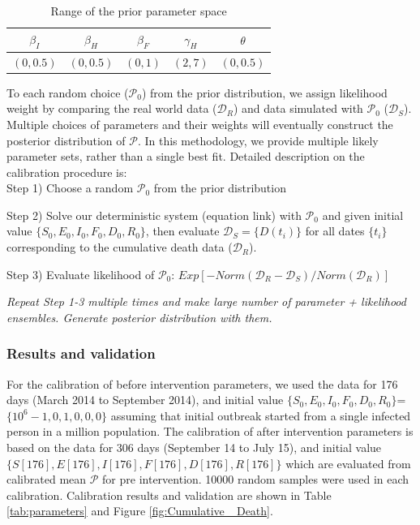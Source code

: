 \begin{table}[ht]
\caption{Range of the prior parameter space} %
\centering %
\begin{tabular}{c c c c c}
\hline\hline %
$\beta_{I}$ & $\beta_{H}$ & $\beta_{F}$ & $\gamma_{H}$ & $\theta$ \\ [0.5ex]
\hline %
$(0,0.5)$ & $(0,0.5)$ & $(0,1)$ & $(2,7)$ & $(0,0.5)$ \\ [0.5ex]
\hline
\end{tabular}
\label{tab:PriorRanges}
\end{table}


To each random choice ($\mathcal{P}_0$) from the prior distribution, we assign likelihood weight by comparing the real world data ($\mathcal{D}_R$) and data simulated with $\mathcal{P}_0$ ($\mathcal{D}_S$). Multiple choices of parameters and their weights will eventually construct the posterior distribution of $\mathcal{P}$. In this methodology, we provide multiple likely parameter sets, rather than a single best fit. Detailed description on the calibration procedure is:\\

Step 1) Choose a random $\mathcal{P}_0$ from the prior distribution

Step 2) Solve our deterministic system (equation link) with $\mathcal{P}_0$ and given initial value $\{S_0,E_0,I_0,F_0,D_0,R_0\}$, then evaluate $\mathcal{D}_S=\{D(t_i)\}$ for all dates $\{t_i\}$ corresponding to the cumulative death data ($\mathcal{D}_R$).

Step 3) Evaluate likelihood of $\mathcal{P}_0$: $Exp[-Norm(\mathcal{D}_R-\mathcal{D}_S)/Norm(\mathcal{D}_R)]$

\emph{Repeat Step 1-3 multiple times and make large number of {parameter + likelihood} ensembles. Generate posterior distribution with them.}

\subsubsection{Results and validation}
For the calibration of before intervention parameters, we used the data for 176 days (March 2014 to September 2014), and initial value $\{S_0,E_0,I_0,F_0,D_0,R_0\}$=$\{10^6-1,0,1,0,0,0\}$ assuming that initial outbreak started from a single infected person in a million population. The calibration of after intervention parameters is based on the data for 306 days (September 14 to July 15), and initial value $\{S[176],E[176],I[176],F[176],D[176],R[176]\}$ which are evaluated from calibrated mean $\mathcal{P}$ for pre intervention. 10000 random samples were used in each calibration. Calibration results and validation are shown in Table \ref{tab:parameters} and Figure \ref{fig:Cumulative _Death}.\\

